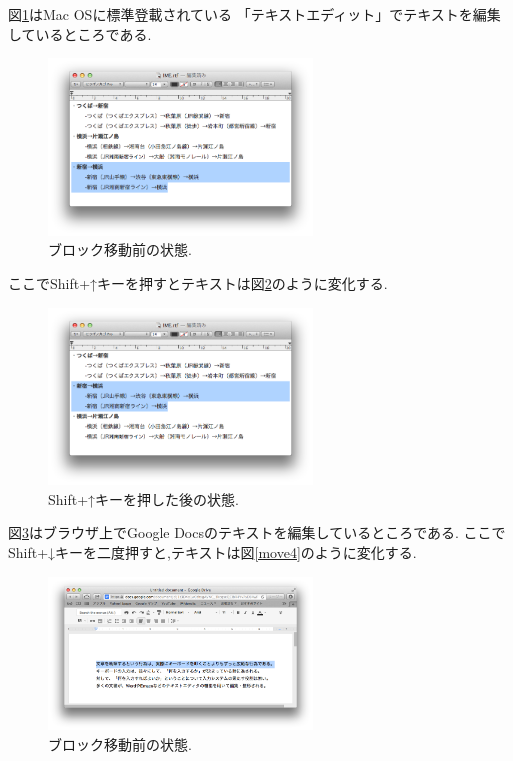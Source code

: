 図\ref{move1}はMac OSに標準登載されている
「テキストエディット」でテキストを編集しているところである.

\begin{figure}[H]
\centerline{\includegraphics[width=70mm,bb=0 0 703 472]{figures/block2.png}}
\caption{ブロック移動前の状態.}
\label{move1}
\end{figure}

ここでShift+↑キーを押すとテキストは図\ref{move2}のように変化する.

\begin{figure}[H]
\centerline{\includegraphics[width=70mm,bb=0 0 703 472]{figures/block3.png}}
\caption{Shift+↑キーを押した後の状態.}
\label{move2}
\end{figure}

図\ref{move3}はブラウザ上でGoogle Docsのテキストを編集しているところである.
ここでShift+↓キーを二度押すと,テキストは図\ref{move4}のように変化する.

\begin{figure}[H]
\centerline{\includegraphics[width=70mm,bb=0 0 935 542]{figures/block4.png}}
\caption{ブロック移動前の状態.}
\label{move3}
\end{figure}

